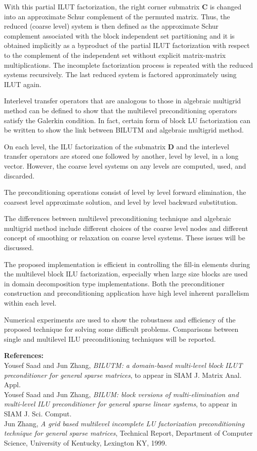 \documentclass[11pt]{article}
\begin{document}
With this partial ILUT factorization, the
right corner submatrix ${\mathbf C}$ is changed into an approximate
Schur complement of the permuted matrix. Thus, the reduced
(coarse level) system is then defined as the approximate
Schur  complement associated with the block independent set
partitioning and it
is obtained  implicitly as  a byproduct of   the
partial ILUT factorization with respect to the complement of the
independent set without explicit matrix-matrix multiplications.
The incomplete factorization process
is repeated with the reduced systems
recursively. The last  reduced system is factored
approximately using ILUT again.

Interlevel transfer operators that are analogous to those in
algebraic multigrid method can be defined to show that the
multilevel preconditioning
operators satisfy the Galerkin condition. In fact, certain form
of block LU factorization can be written to show the
link between BILUTM and algebraic multigrid method.

On each level, the ILU factorization of the submatrix ${\mathbf D}$ and
the interlevel transfer operators are stored one followed
by another, level by level, in a long vector. However, the coarse
level systems on any levels are computed, used, and discarded.

The preconditioning operations consist of level by level forward
elimination, the coarsest level approximate solution, and level by
level backward substitution.

The differences between multilevel preconditioning technique
and algebraic multigrid method include different choices of the
coarse level nodes and different concept of smoothing or
relaxation on coarse level systems. These issues will be
discussed.

The proposed implementation is efficient in controlling  the fill-in
elements  during  the multilevel block  ILU factorization, especially
when large  size  blocks are  used   in  domain  decomposition  type
implementations. Both the preconditioner construction and
preconditioning application have high level inherent
parallelism within each level.

Numerical experiments are used to show the robustness
and efficiency of  the proposed technique  for
solving  some difficult problems. Comparisons between single
and multilevel ILU preconditioning techniques will be
reported.

\pagebreak

{\bf References:} \\
Yousef Saad and Jun Zhang, {\em
	BILUTM: a domain-based multi-level
	block ILUT preconditioner for general sparse matrices},
	to appear in SIAM J. Matrix Anal. Appl.
\\{}
Yousef Saad and Jun Zhang, {\em
	BILUM: block versions of multi-elimination and multi-level
	ILU preconditioner for general sparse linear systems},
	to appear in SIAM J. Sci. Comput.
\\{}
Jun Zhang, {\em A grid based  multilevel incomplete LU factorization
	preconditioning technique for general sparse matrices},
	Technical Report, Department of Computer Science,
	University of Kentucky, Lexington KY, 1999.
\end{document}
